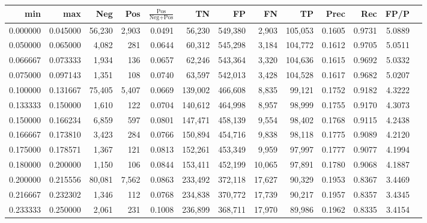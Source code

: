 \begin{tabular}{rrrrrrrrrrrrr}
\toprule
     min &      max &    Neg &    Pos & $\frac{\text{Pos}}{\text{Neg}+\text{Pos}}$ &      TN &      FP &      FN &      TP &   Prec &    Rec &   FP/P \\
\midrule
0.000000 & 0.045000 & 56,230 &  2,903 &                                     0.0491 &  56,230 & 549,380 &   2,903 & 105,053 & 0.1605 & 0.9731 & 5.0889 \\
0.050000 & 0.065000 &  4,082 &    281 &                                     0.0644 &  60,312 & 545,298 &   3,184 & 104,772 & 0.1612 & 0.9705 & 5.0511 \\
0.066667 & 0.073333 &  1,934 &    136 &                                     0.0657 &  62,246 & 543,364 &   3,320 & 104,636 & 0.1615 & 0.9692 & 5.0332 \\
0.075000 & 0.097143 &  1,351 &    108 &                                     0.0740 &  63,597 & 542,013 &   3,428 & 104,528 & 0.1617 & 0.9682 & 5.0207 \\
0.100000 & 0.131667 & 75,405 &  5,407 &                                     0.0669 & 139,002 & 466,608 &   8,835 &  99,121 & 0.1752 & 0.9182 & 4.3222 \\
0.133333 & 0.150000 &  1,610 &    122 &                                     0.0704 & 140,612 & 464,998 &   8,957 &  98,999 & 0.1755 & 0.9170 & 4.3073 \\
0.150000 & 0.166234 &  6,859 &    597 &                                     0.0801 & 147,471 & 458,139 &   9,554 &  98,402 & 0.1768 & 0.9115 & 4.2438 \\
0.166667 & 0.173810 &  3,423 &    284 &                                     0.0766 & 150,894 & 454,716 &   9,838 &  98,118 & 0.1775 & 0.9089 & 4.2120 \\
0.175000 & 0.178571 &  1,367 &    121 &                                     0.0813 & 152,261 & 453,349 &   9,959 &  97,997 & 0.1777 & 0.9077 & 4.1994 \\
0.180000 & 0.200000 &  1,150 &    106 &                                     0.0844 & 153,411 & 452,199 &  10,065 &  97,891 & 0.1780 & 0.9068 & 4.1887 \\
0.200000 & 0.215556 & 80,081 &  7,562 &                                     0.0863 & 233,492 & 372,118 &  17,627 &  90,329 & 0.1953 & 0.8367 & 3.4469 \\
0.216667 & 0.232302 &  1,346 &    112 &                                     0.0768 & 234,838 & 370,772 &  17,739 &  90,217 & 0.1957 & 0.8357 & 3.4345 \\
0.233333 & 0.250000 &  2,061 &    231 &                                     0.1008 & 236,899 & 368,711 &  17,970 &  89,986 & 0.1962 & 0.8335 & 3.4154 \\

\end{tabular}
